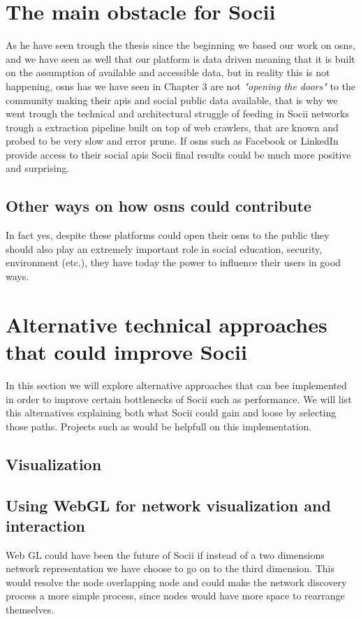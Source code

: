 \section{The main obstacle for Socii}
As he have seen trough the thesis since the beginning we based our work on \glspl{osn}, and we have seen as well that our platform is data driven meaning that it is built on the assumption of available and accessible data, but in reality this is not happening, \glspl{osn} has we have seen in Chapter 3 are not \textit{"opening the doors"} to the community making their \glspl{api} and social public data available, that is why we went trough the technical and architectural struggle of feeding in Socii networks trough a extraction pipeline built on top of web crawlers, that are known and probed to be very slow and error prune. If \glspl{osn} such as Facebook or LinkedIn provide access to their social \glspl{api} Socii final results could be much more positive and surprising.

\subsection*{Other ways on how \glspl{osn} could contribute}
In fact yes, despite these platforms could open their \glspl{osn} to the public they should also play an extremely important role in social education, security, environment (etc.), they have today the power to influence their users in good ways.

\section{Alternative technical approaches that could improve Socii}
In this section we will explore alternative approaches that can bee implemented in order to improve certain bottlenecks of Socii such as performance. We will list this alternatives explaining both what Socii could gain and loose by selecting those paths. Projects such as \citep{graphosaurus} would be helpfull on this implementation.

\subsection{Visualization}

\subsection*{Using WebGL for network visualization and interaction}
Web GL \citep{marrin2011webgl} could have been the future of Socii if instead of a two dimensions network representation we have choose to go on to the third dimension. This would resolve the node overlapping node and could make the network discovery process a more simple process, since nodes would have more space to rearrange themselves.

